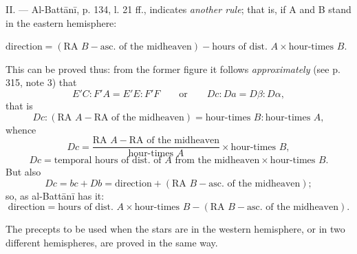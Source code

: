 \documentclass[11pt]{article}
\begin{document}
\par II. — Al-Battānī, p. 134, l. 21 ff., indicates \emph{another rule}; that is, if A and B stand in the eastern hemisphere: \par\noindent\hspace*{1.5em}$\displaystyle \text{direction} = (\text{RA } B - \text{asc. of the midheaven}) - \text{hours of dist. } A\times\text{hour-times } B.$\par\par
\par This can be proved thus: from the former figure it follows \emph{approximately} (see p. 315, note 3) that \[ E'C : F'A = E'E : F'F \qquad\text{or}\qquad Dc : Da = D\beta : D\alpha, \] that is \[ Dc : (\text{RA } A - \text{RA of the midheaven}) = \text{hour-times } B : \text{hour-times } A, \] whence \[ Dc = \frac{\text{RA } A - \text{RA of the midheaven}}{\text{hour-times } A}\times\text{hour-times } B, \] \[ Dc = \text{temporal hours of dist. of } A \text{ from the midheaven}\times\text{hour-times } B. \] But also \[ Dc = bc + Db = \text{direction} + (\text{RA } B - \text{asc. of the midheaven}); \] so, as al-Battānī has it: \[ \text{direction} = \text{hours of dist. } A\times\text{hour-times } B - (\text{RA } B - \text{asc. of the midheaven}). \]\par
\par The precepts to be used when the stars are in the western hemisphere, or in two different hemispheres, are proved in the same way.\par
\end{document}
